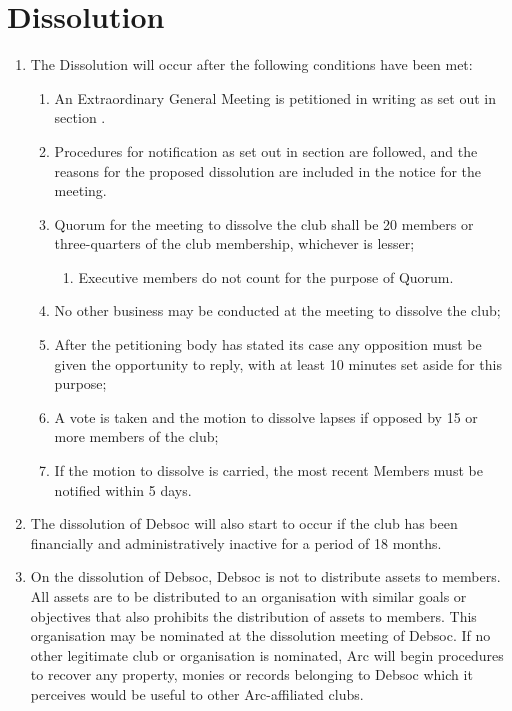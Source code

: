 \newpage
\section{Dissolution}

\begin{enumerate}
\item The Dissolution will occur after the following conditions have been met:
  \begin{enumerate}
  \item An Extraordinary General Meeting is petitioned in writing as set out in section .
  \item Procedures for notification as set out in section  are followed, and the reasons for the proposed dissolution are included in the notice for the meeting.
  \item Quorum for the meeting to dissolve the club shall be 20 members or three-quarters of the club membership, whichever is lesser;
    \begin{enumerate}
    \item Executive members do not count for the purpose of Quorum.
    \end{enumerate}
  \item No other business may be conducted at the meeting to dissolve the club;
  \item After the petitioning body has stated its case any opposition must be given the opportunity to reply, with at least 10 minutes set aside for this purpose;
  \item A vote is taken and the motion to dissolve lapses if opposed by 15 or more members of the club;
  \item If the motion to dissolve is carried, the most recent Members must be notified within 5 days.
  \end{enumerate}
\item The dissolution of Debsoc will also start to occur if the club has been financially and administratively inactive for a period of 18 months.
\item On the dissolution of Debsoc, Debsoc is not to distribute assets to members. All assets are to be distributed to an organisation with similar goals or objectives that also prohibits the distribution of assets to members. This organisation may be nominated at the dissolution meeting of Debsoc. If no other legitimate club or organisation is nominated, Arc will begin procedures to recover any property, monies or records belonging to Debsoc which it perceives would be useful to other Arc-affiliated clubs.
\end{enumerate}
